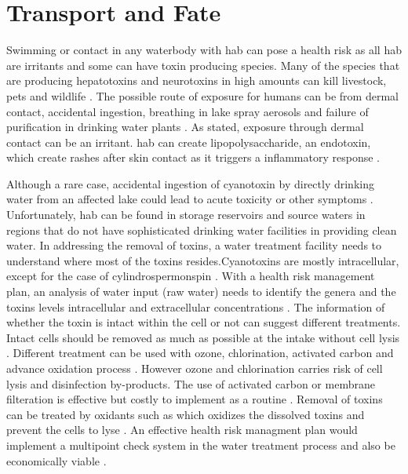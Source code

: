  \clearpage

\section{Transport and Fate}
Swimming or contact in any waterbody with \gls{hab} can pose a health risk as all \gls{hab} are irritants and some can have toxin producing species. Many of the species that are producing hepatotoxins and neurotoxins in high amounts can kill livestock, pets and wildlife \cite{anderson_harmful_2002}. The possible route of exposure  for humans can be from dermal contact, accidental ingestion, breathing in lake spray aerosols and failure of purification in drinking water plants \cite{may_aerosol_2018,codd_cyanobacterial_1999}. As stated, exposure through dermal contact can be an irritant. \gls{hab} can create lipopolysaccharide, an endotoxin, which create rashes after skin contact as it triggers a inflammatory response \cite{ moore_richard_cyanobacterial_1993}.

Although a rare case, accidental ingestion of cyanotoxin by directly drinking water from an affected lake could  lead to acute toxicity or other symptoms \cite{monks_potent_2007}. Unfortunately, \gls{hab} can be found in storage reservoirs and source waters in regions that do not have sophisticated drinking water facilities in providing clean water. In addressing the removal of toxins, a water treatment facility needs to understand where most of the toxins resides.Cyanotoxins are mostly intracellular, except for the case of cylindrospermonspin \cite{rastogi_cyanotoxin-microcystins:_2014}.
 With a health risk management plan, an analysis of water input (raw water) needs to identify the genera and the toxins levels intracellular and extracellular concentrations \cite{saoudi_management_2017}. The information of whether the toxin is intact within the cell or not can suggest different treatments. Intact cells should be removed as much as possible at the intake without cell lysis \cite{westrick_review_2010}. Different treatment can be used with ozone, chlorination, activated carbon and advance oxidation process \cite{koreiviene_cyanotoxin_2014, westrick_cyanotoxin_2018}. However ozone and chlorination carries risk of cell lysis and disinfection by-products. The use of activated carbon or membrane filteration is effective but costly to implement as a routine \cite{koreiviene_cyanotoxin_2014}. Removal of toxins can be treated by oxidants such as  which oxidizes the dissolved toxins and prevent the cells to lyse \cite{westrick_cyanotoxin_2018}. An effective health risk managment plan would implement a multipoint check system in the water treatment process and also be economically viable \cite{westrick_review_2010,saoudi_management_2017}.


